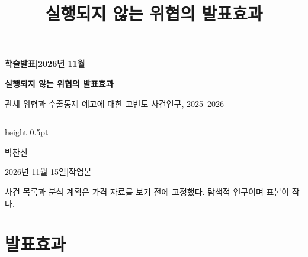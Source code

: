 \documentclass[aspectratio=169,9pt,t]{beamer}
\title{실행되지 않는 위협의 발표효과}
\begin{document}
{
\begin{frame}[noframenumbering]
\vspace{14mm}
{\fontsize{8.5}{11}\selectfont\bfseries\color{navy} 학술발표\quad|\quad 2026년 11월\par}
\vspace{3mm}
{\fontsize{25}{31}\selectfont\bfseries 실행되지 않는 위협의 발표효과\par}
\vspace{3.5mm}
{\fontsize{13}{17}\selectfont 관세 위협과 수출통제 예고에 대한 고빈도 사건연구, 2025--2026\par}
\vspace{6mm}
{\color{ink}\hrule height 0.5pt}
\vspace{6mm}
{\large 박찬진\par}
\vspace{1.5mm}
{\small\color{mute} 2026년 11월 15일\quad|\quad 작업본\par}
\vfill
{\footnotesize\color{mute}\linespread{1.15}\selectfont 사건 목록과 분석 계획은 가격 자료를 보기 전에 고정했다. 탐색적 연구이며 표본이 작다.\par}
\vspace{6mm}
\end{frame}
}

\section{발표효과}
\end{document}
